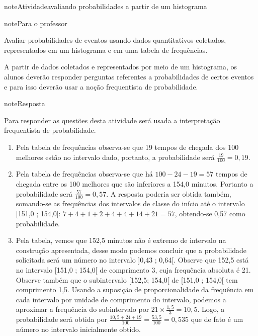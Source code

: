 \begin{sphinxadmonition}{note}{Atividade}{avaliando probabilidades a partir de um histograma}
\label{ativ-probabilidade-histograma}

\begin{sphinxadmonition}{note}{Para o professor}

  Avaliar probabilidades de eventos usando dados quantitativos coletados, representados em um histograma e em uma tabela de frequências.

  A partir de dados coletados e representados por meio de um histograma, os alunos deverão responder perguntas referentes a probabilidades de certos eventos e para isso deverão usar a noção frequentista de probabilidade.

\begin{sphinxadmonition}{note}{Resposta}

Para responder as questões desta atividade será usada a interpretação frequentista de probabilidade.
\begin{enumerate}
\item {} 
Pela tabela de frequências observa-se que 19 tempos de chegada dos 100 melhores estão no intervalo dado, portanto, a probabilidade será \(\frac{19}{100}=0,19\).

\item {} 
Pela tabela de frequências observa-se que há \(100-24-19=57\) tempos de chegada entre os 100 melhores que são inferiores a 154,0 minutos. Portanto a probabilidade será \(\frac{57}{100}=0,57\). A resposta poderia ser obtida também, somando-se as frequências dos intervalos de classe do início até o intervalo {[}151,0 ; 154,0{[}: \(7+4+1+2+4+4+14+21=57\), obtendo-se 0,57 como probabilidade.

\item {} 
Pela tabela, vemos que 152,5 minutos não é extremo de intervalo na construção apresentada, desse modo podemos concluir que a probabilidade solicitada será um número no intervalo {]}0,43 ; 0,64{[}. Observe que 152,5 está no intervalo {[}151,0 ; 154,0{[} de comprimento 3, cuja frequência absoluta é 21. Observe também que o subintervalo {[}152,5; 154,0{[}  de {[}151,0 ; 154,0{[} tem comprimento 1,5. Usando a suposição de proporcionalidade da frequência em cada intervalo por unidade de comprimento do intervalo, podemos a aproximar a frequência do subintervalo por \(21\times \frac{1,5}{3}=10,5\). Logo, a probabilidade será obtida por \(\frac{10,5+24+19}{100}=\frac{53,5}{100}=0,535\) que de fato é um número no intervalo inicialmente obtido.


\end{enumerate}
\end{sphinxadmonition}
\end{sphinxadmonition}
\end{sphinxadmonition}
